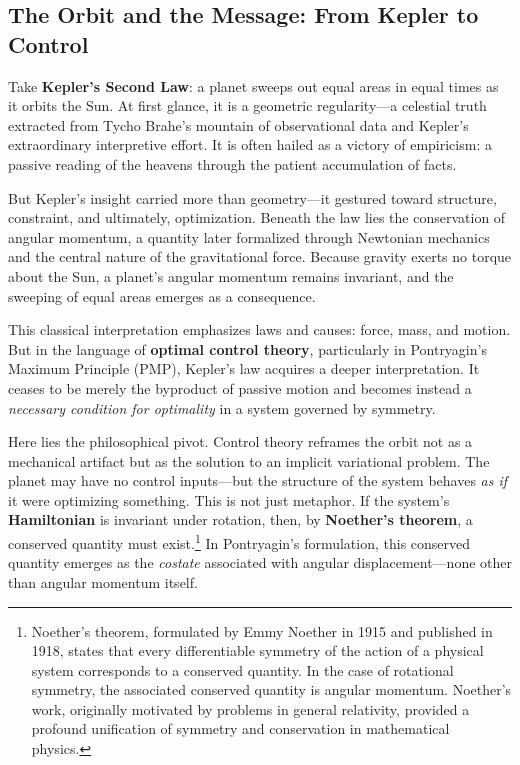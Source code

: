 \subsection{The Orbit and the Message: From Kepler to Control}

Take \textbf{Kepler’s Second Law}: a planet sweeps out equal areas in equal times as it orbits the Sun. At first glance, it is a geometric regularity—a celestial truth extracted from Tycho Brahe’s mountain of observational data and Kepler’s extraordinary interpretive effort. It is often hailed as a victory of empiricism: a passive reading of the heavens through the patient accumulation of facts.

But Kepler’s insight carried more than geometry—it gestured toward structure, constraint, and ultimately, optimization. Beneath the law lies the conservation of angular momentum, a quantity later formalized through Newtonian mechanics and the central nature of the gravitational force. Because gravity exerts no torque about the Sun, a planet’s angular momentum remains invariant, and the sweeping of equal areas emerges as a consequence.

This classical interpretation emphasizes laws and causes: force, mass, and motion. But in the language of \textbf{optimal control theory}, particularly in Pontryagin’s Maximum Principle (PMP), Kepler’s law acquires a deeper interpretation. It ceases to be merely the byproduct of passive motion and becomes instead a \emph{necessary condition for optimality} in a system governed by symmetry.

Here lies the philosophical pivot. Control theory reframes the orbit not as a mechanical artifact but as the solution to an implicit variational problem. The planet may have no control inputs—but the structure of the system behaves \emph{as if} it were optimizing something. This is not just metaphor. If the system’s \textbf{Hamiltonian} is invariant under rotation, then, by \textbf{Noether’s theorem}, a conserved quantity must exist.\footnote{Noether’s theorem, formulated by Emmy Noether in 1915 and published in 1918, states that every differentiable symmetry of the action of a physical system corresponds to a conserved quantity. In the case of rotational symmetry, the associated conserved quantity is angular momentum. Noether’s work, originally motivated by problems in general relativity, provided a profound unification of symmetry and conservation in mathematical physics.} In Pontryagin’s formulation, this conserved quantity emerges as the \emph{costate} associated with angular displacement—none other than angular momentum itself.

